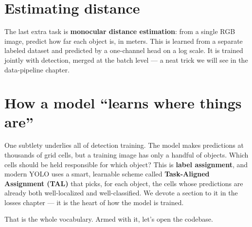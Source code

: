 \section{Estimating distance}
The last extra task is \textbf{monocular distance estimation}: from a single RGB image,
predict how far each object is, in meters. This is learned from a separate labeled dataset
and predicted by a one-channel head on a log scale. It is trained jointly with detection,
merged at the batch level --- a neat trick we will see in the data-pipeline chapter.

\section{How a model ``learns where things are''}
One subtlety underlies all of detection training. The model makes predictions at thousands
of grid cells, but a training image has only a handful of objects. Which cells should be
held responsible for which object? This is \textbf{label assignment}, and modern YOLO uses
a smart, learnable scheme called \textbf{Task-Aligned Assignment (TAL)} that picks, for
each object, the cells whose predictions are already both well-localized and
well-classified. We devote a section to it in the losses chapter --- it is the heart of how
the model is trained.

\medskip
\noindent That is the whole vocabulary. Armed with it, let's open the codebase.
